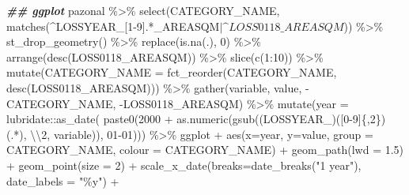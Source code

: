 \documentclass[10pt,landscape,a3paper]{article}
\newenvironment{Shaded}{\begin{snugshade}}{\end{snugshade}}
\newcommand{\AttributeTok}[1]{\textcolor[rgb]{0.77,0.63,0.00}{#1}}
\newcommand{\DecValTok}[1]{\textcolor[rgb]{0.00,0.00,0.81}{#1}}
\newcommand{\DocumentationTok}[1]{\textcolor[rgb]{0.56,0.35,0.01}{\textbf{\textit{#1}}}}
\newcommand{\FloatTok}[1]{\textcolor[rgb]{0.00,0.00,0.81}{#1}}
\newcommand{\FunctionTok}[1]{\textcolor[rgb]{0.00,0.00,0.00}{#1}}
\newcommand{\NormalTok}[1]{#1}
\newcommand{\SpecialCharTok}[1]{\textcolor[rgb]{0.00,0.00,0.00}{#1}}
\newcommand{\StringTok}[1]{\textcolor[rgb]{0.31,0.60,0.02}{#1}}
\begin{document}
\begin{Shaded}
\begin{Highlighting}[]
\DocumentationTok{\#\# ggplot}
\NormalTok{pazonal }\SpecialCharTok{\%\textgreater{}\%} \FunctionTok{select}\NormalTok{(CATEGORY\_NAME, }\FunctionTok{matches}\NormalTok{(}\StringTok{\textquotesingle{}\^{}LOSSYEAR\_[1{-}9].*\_AREASQM$|\^{}LOSS0118\_AREASQM$\textquotesingle{}}\NormalTok{)) }\SpecialCharTok{\%\textgreater{}\%}
  \FunctionTok{st\_drop\_geometry}\NormalTok{() }\SpecialCharTok{\%\textgreater{}\%} 
  \FunctionTok{replace}\NormalTok{(}\FunctionTok{is.na}\NormalTok{(.), }\DecValTok{0}\NormalTok{) }\SpecialCharTok{\%\textgreater{}\%}
  \FunctionTok{arrange}\NormalTok{(}\FunctionTok{desc}\NormalTok{(LOSS0118\_AREASQM)) }\SpecialCharTok{\%\textgreater{}\%} 
  \FunctionTok{slice}\NormalTok{(}\FunctionTok{c}\NormalTok{(}\DecValTok{1}\SpecialCharTok{:}\DecValTok{10}\NormalTok{)) }\SpecialCharTok{\%\textgreater{}\%} 
  \FunctionTok{mutate}\NormalTok{(}\AttributeTok{CATEGORY\_NAME =} \FunctionTok{fct\_reorder}\NormalTok{(CATEGORY\_NAME, }\FunctionTok{desc}\NormalTok{(LOSS0118\_AREASQM))) }\SpecialCharTok{\%\textgreater{}\%} 
  \FunctionTok{gather}\NormalTok{(variable, value, }\SpecialCharTok{{-}}\NormalTok{CATEGORY\_NAME, }\SpecialCharTok{{-}}\NormalTok{LOSS0118\_AREASQM) }\SpecialCharTok{\%\textgreater{}\%}
  \FunctionTok{mutate}\NormalTok{(}\AttributeTok{year =}\NormalTok{ lubridate}\SpecialCharTok{::}\FunctionTok{as\_date}\NormalTok{(}
    \FunctionTok{paste0}\NormalTok{(}\DecValTok{2000} \SpecialCharTok{+} \FunctionTok{as.numeric}\NormalTok{(}\FunctionTok{gsub}\NormalTok{(}\StringTok{\textquotesingle{}(LOSSYEAR\_)([0{-}9]\{,2\})(.*)\textquotesingle{}}\NormalTok{, }\StringTok{\textquotesingle{}}\SpecialCharTok{\textbackslash{}\textbackslash{}}\StringTok{2\textquotesingle{}}\NormalTok{, variable)), }\StringTok{\textquotesingle{}{-}01{-}01\textquotesingle{}}\NormalTok{))) }\SpecialCharTok{\%\textgreater{}\%} 
\NormalTok{  ggplot }\SpecialCharTok{+} \FunctionTok{aes}\NormalTok{(}\AttributeTok{x=}\NormalTok{year, }\AttributeTok{y=}\NormalTok{value, }\AttributeTok{group =}\NormalTok{ CATEGORY\_NAME, }\AttributeTok{colour =}\NormalTok{ CATEGORY\_NAME) }\SpecialCharTok{+} 
  \FunctionTok{geom\_path}\NormalTok{(}\AttributeTok{lwd =} \FloatTok{1.5}\NormalTok{) }\SpecialCharTok{+} 
  \FunctionTok{geom\_point}\NormalTok{(}\AttributeTok{size =} \DecValTok{2}\NormalTok{) }\SpecialCharTok{+} 
  \FunctionTok{scale\_x\_date}\NormalTok{(}\AttributeTok{breaks=}\FunctionTok{date\_breaks}\NormalTok{(}\StringTok{"1 year"}\NormalTok{), }\AttributeTok{date\_labels =} \StringTok{"\%y"}\NormalTok{) }\SpecialCharTok{+} 

\end{Highlighting}
\end{Shaded}
\end{document}
